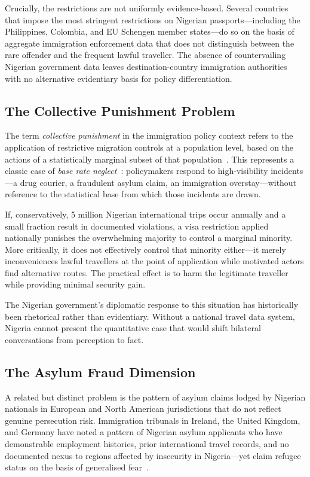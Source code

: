 \documentclass[11pt]{article}
\begin{document}
Crucially, the restrictions are not uniformly evidence-based.
Several countries that impose the most stringent restrictions on
Nigerian passports---including the Philippines, Colombia, and EU
Schengen member states---do so on the basis of aggregate immigration
enforcement data that does not distinguish between the rare offender
and the frequent lawful traveller. The absence of countervailing
Nigerian government data leaves destination-country immigration
authorities with no alternative evidentiary basis for policy
differentiation.

\subsection{The Collective Punishment Problem}

The term \textit{collective punishment} in the immigration policy context
refers to the application of restrictive migration controls at a
population level, based on the actions of a statistically marginal
subset of that population~\cite{castles2013}. This represents a classic
case of \textit{base rate neglect}~\cite{kahneman2011}: policymakers
respond to high-visibility incidents---a drug courier, a fraudulent
asylum claim, an immigration overstay---without reference to the
statistical base from which those incidents are drawn.

If, conservatively, 5 million Nigerian international trips occur
annually and a small fraction result in documented violations, a
visa restriction applied nationally punishes the overwhelming majority
to control a marginal minority. More critically, it does not effectively
control that minority either---it merely inconveniences lawful travellers
at the point of application while motivated actors find alternative routes.
The practical effect is to harm the legitimate traveller while providing
minimal security gain.

The Nigerian government's diplomatic response to this situation has
historically been rhetorical rather than evidentiary. Without a
national travel data system, Nigeria cannot present the quantitative
case that would shift bilateral conversations from perception to fact.

\subsection{The Asylum Fraud Dimension}

A related but distinct problem is the pattern of asylum claims lodged
by Nigerian nationals in European and North American jurisdictions
that do not reflect genuine persecution risk. Immigration tribunals in
Ireland, the United Kingdom, and Germany have noted a pattern of
Nigerian asylum applicants who have demonstrable employment histories,
prior international travel records, and no documented nexus to regions
affected by insecurity in Nigeria---yet claim refugee status on the
basis of generalised fear~\cite{eurostat2024,irishnat2023}.
\end{document}
